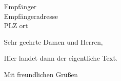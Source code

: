 \documentclass[
	ngerman,%
	]{scrartcl}
\begin{document}
	


	
\begin{letter}{Empfänger\\Empfängeradresse\\PLZ ort}
	

	
\opening{Sehr geehrte Damen und Herren,}%

Hier landet dann der eigentliche Text.

\closing{Mit freundlichen Grüßen}




	
\end{letter}
\end{document}

